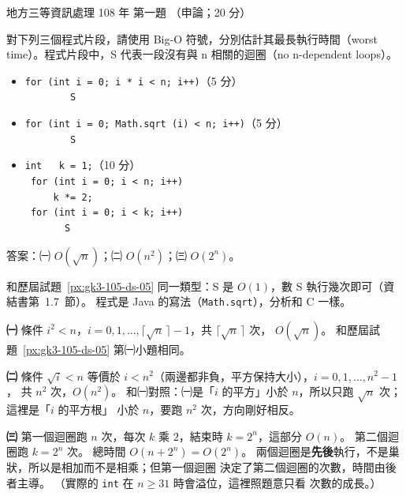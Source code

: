 \begin{pastexam}[label={px:df3-108-ds-01}]{地方三等資訊處理 108 年 第一題}
（申論；20 分）

對下列三個程式片段，請使用 Big-O 符號，分別估計其最長執行時間（worst time）。程式片段中，S 代表一段沒有與 n
相關的迴圈（no n-dependent loops）。
\begin{itemize}[leftmargin=2.2em, nosep]
\item[㈠] \texttt{for (int i = 0; i * i < n; i++)}\quad（5 分）\\
\texttt{\ \ \ \ \ \ \ \ S}
\item[㈡] \texttt{for (int i = 0; Math.sqrt (i) < n; i++)}\quad（5 分）\\
\texttt{\ \ \ \ \ \ \ \ S}
\item[㈢] \texttt{int\ \ \ k = 1;}\quad（10 分）\\
\texttt{\ for (int i = 0; i < n; i++)}\\
\texttt{\ \ \ \ \ k *= 2;}\\
\texttt{\ for (int i = 0; i < k; i++)}\\
\texttt{\ \ \ \ \ \ \ S}
\end{itemize}
\end{pastexam}

\begin{pastsoln}
答案：㈠ $O(\sqrt{n})$；㈡ $O(n^2)$；㈢ $O(2^n)$。

和歷屆試題~\ref{px:gk3-105-ds-05} 同一類型：S 是 $O(1)$，數 S 執行幾次即可（資結書第~1.7~節）。 程式是
Java 的寫法（\texttt{Math.sqrt}），分析和 C 一樣。

\textbf{㈠} 條件 $i^2 < n$，$i = 0, 1, \ldots, \lceil \sqrt{n}\,\rceil - 1$，共 $\lceil \sqrt{n}\,\rceil$ 次，
$O(\sqrt{n})$。 和歷屆試題~\ref{px:gk3-105-ds-05} 第㈠小題相同。

\textbf{㈡} 條件 $\sqrt{i} < n$ 等價於 $i < n^2$（兩邊都非負，平方保持大小），$i = 0, 1, \ldots, n^2 - 1$，
共 $n^2$ 次，$O(n^2)$。 和㈠對照：㈠是「$i$ 的平方」小於 $n$，所以只跑 $\sqrt{n}$ 次；這裡是「$i$ 的平方根」
小於 $n$，要跑 $n^2$ 次，方向剛好相反。

\textbf{㈢} 第一個迴圈跑 $n$ 次，每次 $k$ 乘 $2$，結束時 $k = 2^n$，這部分 $O(n)$。 第二個迴圈跑 $k = 2^n$ 次。
總時間 $O(n + 2^n) = O(2^n)$。 兩個迴圈是\textbf{先後}執行，不是巢狀，所以是相加而不是相乘；但第一個迴圈
決定了第二個迴圈的次數，時間由後者主導。 （實際的 \texttt{int} 在 $n \ge 31$ 時會溢位，這裡照題意只看
次數的成長。）
\end{pastsoln}
